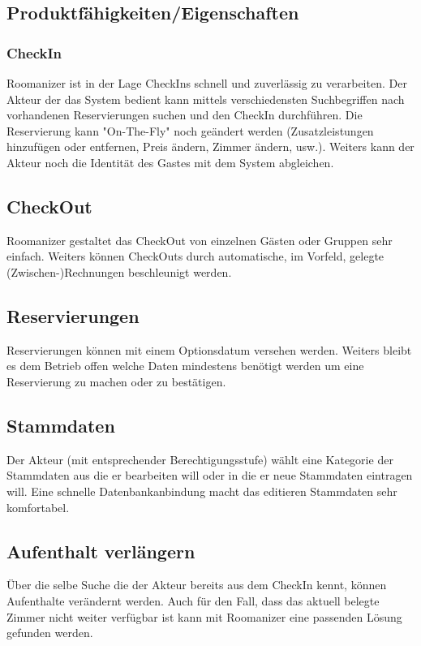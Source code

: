 \documentclass[10pt,a4paper,titlepage]{article}
\begin{document}
\subsection{Produktfähigkeiten/Eigenschaften}
\subsubsection{CheckIn }
Roomanizer ist in der Lage CheckIns schnell und zuverlässig zu verarbeiten. Der Akteur der das System bedient kann mittels  verschiedensten Suchbegriffen nach vorhandenen Reservierungen suchen und den CheckIn durchführen. Die Reservierung kann "On-The-Fly" noch geändert werden (Zusatzleistungen hinzufügen oder entfernen, Preis ändern, Zimmer ändern, usw.). Weiters kann der Akteur noch die Identität des Gastes mit dem System abgleichen.

\subsection{CheckOut }
Roomanizer gestaltet das CheckOut von einzelnen Gästen oder Gruppen sehr einfach. Weiters können CheckOuts durch automatische, im Vorfeld, gelegte (Zwischen-)Rechnungen beschleunigt werden.

\subsection{Reservierungen}
Reservierungen können mit einem Optionsdatum versehen werden. Weiters bleibt es dem Betrieb offen welche Daten mindestens benötigt werden um eine Reservierung zu machen oder zu bestätigen.

\subsection{Stammdaten }
Der Akteur (mit entsprechender Berechtigungsstufe) wählt eine Kategorie der Stammdaten aus die er bearbeiten will oder in die er neue Stammdaten eintragen will. Eine schnelle Datenbankanbindung macht das editieren Stammdaten sehr komfortabel.

\subsection{Aufenthalt verlängern }
Über die selbe Suche die der Akteur bereits aus dem CheckIn kennt, können Aufenthalte verändernt werden. Auch für den Fall, dass das aktuell belegte Zimmer nicht weiter verfügbar ist kann mit Roomanizer eine passenden Lösung gefunden werden. 
\end{document}
